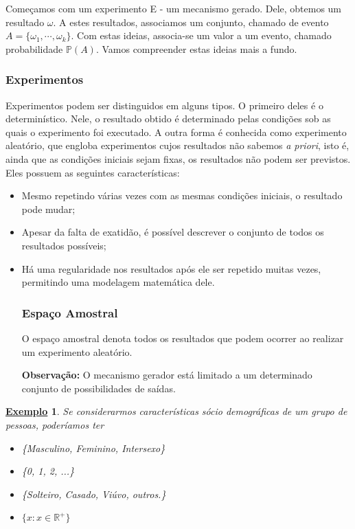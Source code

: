 \documentclass{article}
\newtheorem{example}{\underline{Exemplo}}
\begin{document}
Começamos com um experimento E - um mecanismo gerado. Dele, obtemos um resultado \(\omega \). A estes resultados,
associamos um conjunto, chamado de evento \(A = \{\omega_{1}, \cdots, \omega_{k}\}\). Com estas ideias, associa-se um valor
a um evento, chamado probabilidade \(\mathbb{P}(A).\) Vamos compreender estas ideias mais a fundo.

\subsubsection{Experimentos}
Experimentos podem ser distinguidos em alguns tipos. O primeiro deles é o determinístico. Nele,
o resultado obtido é determinado pelas condições sob as quais o experimento foi executado. A outra forma 
é conhecida como experimento aleatório, que engloba experimentos cujos resultados não sabemos \textit{a priori}, isto é,
ainda que as condições iniciais sejam fixas, os resultados não podem ser previstos. Eles possuem as seguintes características:
\begin{itemize}
  \item[a)] Mesmo repetindo várias vezes com as mesmas condições iniciais, o resultado pode mudar;
  \item[b)] Apesar da falta de exatidão, é possível descrever o conjunto de todos os resultados possíveis;
  \item[c)] Há uma regularidade nos resultados após ele ser repetido muitas vezes, permitindo uma modelagem matemática dele.
    \subsubsection{Espaço Amostral}
    O espaço amostral denota todos os resultados que podem ocorrer ao realizar um experimento aleatório.

    \textbf{Observação:} O mecanismo gerador está limitado a um determinado conjunto de possibilidades de saídas.
\end{itemize}
\begin{example}
  Se considerarmos características sócio demográficas de um grupo de pessoas, poderíamos ter
  \begin{itemize}
    \item[Sexo:)] \{Masculino, Feminino, Intersexo\}
    \item[Idade:)] \{0, 1, 2, ...\}
    \item[Estado civil:)] \{Solteiro, Casado, Viúvo, outros.\}
    \item[Renda familiar:)] \(\{x: x\in \mathbb{R}^{+}\}\)
  \end{itemize}
\end{example}
\end{document}
